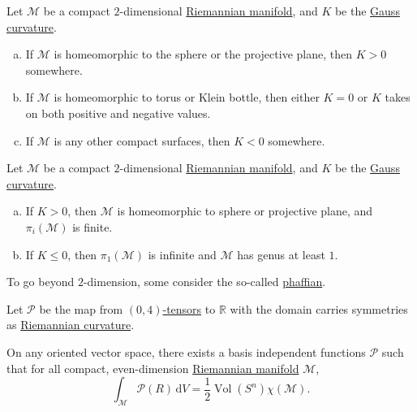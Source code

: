 \begin{corollary}
	Let \(\mathcal{M} \) be a compact \(2\)-dimensional \hyperref[def:Riemannian-manifold]{Riemannian manifold}, and \(K\) be the \hyperref[rmk:Gauss-curvature]{Gauss curvature}.
	\begin{enumerate}[(a)]
		\item If \(\mathcal{M} \) is homeomorphic to the sphere or the projective plane, then \(K > 0\) somewhere.
		\item If \(\mathcal{M} \) is homeomorphic to torus or Klein bottle, then either \(K = 0\) or \(K\) takes on both positive and negative values.
		\item If \(\mathcal{M} \) is any other compact surfaces, then \(K < 0\) somewhere.
	\end{enumerate}
\end{corollary}

\begin{corollary}
	Let \(\mathcal{M} \) be a compact \(2\)-dimensional \hyperref[def:Riemannian-manifold]{Riemannian manifold}, and \(K\) be the \hyperref[rmk:Gauss-curvature]{Gauss curvature}.
	\begin{enumerate}[(a)]
		\item If \(K > 0\), then \(\mathcal{M} \) is homeomorphic to sphere or projective plane, and \(\pi _i(\mathcal{M} )\) is finite.
		\item If \(K \leq 0\), then \(\pi _1(\mathcal{M} )\) is infinite and \(\mathcal{M} \) has genus at least \(1\).
	\end{enumerate}
\end{corollary}

To go beyond \(2\)-dimension, some consider the so-called \hyperref[def:phaffian]{phaffian}.

\begin{definition}[Pfaffian]\label{def:phaffian}
	Let \(\mathcal{P} \) be the map from \hyperref[def:tensor-field]{\((0, 4)\)-tensors} to \(\mathbb{R} \) with the domain carries symmetries as \hyperref[def:Riemannian-curvature]{Riemannian curvature}.
\end{definition}

\begin{theorem}\label{thm:phaffian}
	On any oriented vector space, there exists a basis independent functions \(\mathcal{P} \) such that for all compact, even-dimension \hyperref[def:Riemannian-manifold]{Riemannian manifold} \(\mathcal{M} \),
	\[
		\int _\mathcal{M} \mathcal{P} (R)\,\mathrm{d} V = \frac{1}{2} \mathop{\mathrm{Vol}}(S^n) \chi (\mathcal{M} ) .
	\]
\end{theorem}

